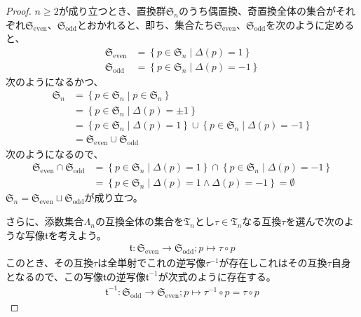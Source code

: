 \documentclass[dvipdfmx]{jsarticle}
\begin{document}
\begin{proof}
$n \geq 2$が成り立つとき、置換群$\mathfrak{S}_{n}$のうち偶置換、奇置換全体の集合がそれぞれ$\mathfrak{S}_{\mathrm{even}}$、$\mathfrak{S}_{\mathrm{odd}}$とおかれると、即ち、集合たち$\mathfrak{S}_{\mathrm{even}}$、$\mathfrak{S}_{\mathrm{odd}}$を次のように定めると、
\begin{align*}
\mathfrak{S}_{\mathrm{even}} &= \left\{ p \in \mathfrak{S}_{n} \middle| \varDelta(p) = 1 \right\}\\
\mathfrak{S}_{\mathrm{odd}} &= \left\{ p \in \mathfrak{S}_{n} \middle| \varDelta(p) = - 1 \right\}
\end{align*}
次のようになるかつ、
\begin{align*}
\mathfrak{S}_{n} &= \left\{ p \in \mathfrak{S}_{n} \middle| p \in \mathfrak{S}_{n} \right\}\\
&= \left\{ p \in \mathfrak{S}_{n} \middle| \varDelta(p) = \pm 1 \right\}\\
&= \left\{ p \in \mathfrak{S}_{n} \middle| \varDelta(p) = 1 \right\} \cup \left\{ p \in \mathfrak{S}_{n} \middle| \varDelta(p) = - 1 \right\}\\
&= \mathfrak{S}_{\mathrm{even}} \cup \mathfrak{S}_{\mathrm{odd}}
\end{align*}
次のようになるので、
\begin{align*}
\mathfrak{S}_{\mathrm{even}} \cap \mathfrak{S}_{\mathrm{odd}} &= \left\{ p \in \mathfrak{S}_{n} \middle| \varDelta(p) = 1 \right\} \cap \left\{ p \in \mathfrak{S}_{n} \middle| \varDelta(p) = - 1 \right\}\\
&= \left\{ p \in \mathfrak{S}_{n} \middle| \varDelta(p) = 1 \land \varDelta(p) = - 1 \right\} = \emptyset
\end{align*}
$\mathfrak{S}_{n} = \mathfrak{S}_{\mathrm{even}} \sqcup \mathfrak{S}_{\mathrm{odd}}$が成り立つ。\par
さらに、添数集合$\varLambda_{n}$の互換全体の集合を$\mathfrak{T}_{n}$とし$\tau \in \mathfrak{T}_{n}$なる互換$\tau$を選んで次のような写像$\mathfrak{t}$を考えよう。
\begin{align*}
\mathfrak{t:}\mathfrak{S}_{\mathrm{even}} \rightarrow \mathfrak{S}_{\mathrm{odd}};p \mapsto \tau \circ p
\end{align*}
このとき、その互換$\tau$は全単射でこれの逆写像$\tau^{- 1}$が存在しこれはその互換$\tau$自身となるので、この写像$\mathfrak{t}$の逆写像$\mathfrak{t}^{- 1}$が次式のように存在する。
\begin{align*}
\mathfrak{t}^{- 1}:\mathfrak{S}_{\mathrm{odd}} \rightarrow \mathfrak{S}_{\mathrm{even}};p \mapsto \tau^{- 1} \circ p = \tau \circ p

\end{align*}
\end{proof}
\end{document}
